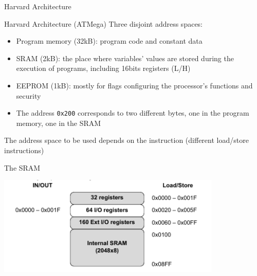 \begin{reveals}
\begin{frame}[c]{Harvard Architecture}
  \vfill

  \begin{block}{Harvard Architecture (ATMega)}
    Three disjoint address spaces:
    \begin{itemize}
    \item Program memory (32kB): program code and constant data
    \item SRAM (2kB): the place where variables' values are stored during
      the execution of programs, including 16bits registers (L/H)
    \item EEPROM (1kB): mostly for flags configuring the processor's
      functions and security
    \item The address \texttt{0x200} corresponds to two different
      bytes, one in the program memory, one in the SRAM
    \end{itemize}
    The address space to be used depends on the instruction (different
    load/store instructions)
  \end{block}

\end{frame}


\begin{frame}[c]{The SRAM}

  \begin{center}
    \includegraphics[width=0.8\textwidth]{images/arduino-SRAM.png}
  \end{center}


\end{frame}
\end{reveals}
